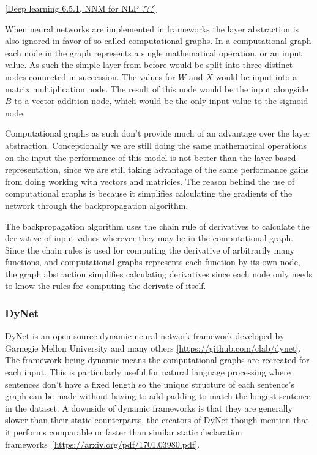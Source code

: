 \ref{Deep learning 6.5.1, NNM for NLP ???}

When neural networks are implemented in frameworks the layer abstraction is also
ignored in favor of so called computational graphs. In a computational graph
each node in the graph represents a single mathematical operation, or an input
value. As such the simple layer from before would be split into three distinct
nodes connected in succession. The values for $W$ and $X$ would be input into a
matrix multiplication node. The result of this node would be the input alongside
$B$ to a vector addition node, which would be the only input value to the
sigmoid node. 

Computational graphs as such don't provide much of an advantage over the layer
abstraction. Conceptionally we are still doing the same mathematical operations
on the input the performance of this model is not better than the layer based
representation, since we are still taking advantage of the same performance
gains from doing working with vectors and matricies. The reason behind the use
of computational graphs is because it simplifies calculating the gradients of
the network through the backpropagation algorithm. 

The backpropagation algorithm uses the chain rule of derivatives to calculate
the derivative of input values wherever they may be in the computational graph.
Since the chain rules is used for computing the derivative of arbitrarily many
functions, and computational graphs represents each function by its own node,
the graph abstraction simplifies calculating derivatives since each node only
needs to know the rules for computing the derivate of itself.
 

\subsubsection*{DyNet}

DyNet is an open source dynamic neural network framework developed by Garnegie
Mellon University and many others \ref{https://github.com/clab/dynet}. The
framework being dynamic means the computational graphs are recreated for each
input. This is particularly useful for natural language processing where
sentences don't have a fixed length so the unique structure of each sentence's
graph can be made without having to add padding to match the longest sentence in
the dataset. A downside of dynamic frameworks is that they are generally slower
than their static counterparts, the creators of DyNet though mention that it
performs comparable or faster than similar static declaration
frameworks~\ref{https://arxiv.org/pdf/1701.03980.pdf}.   

